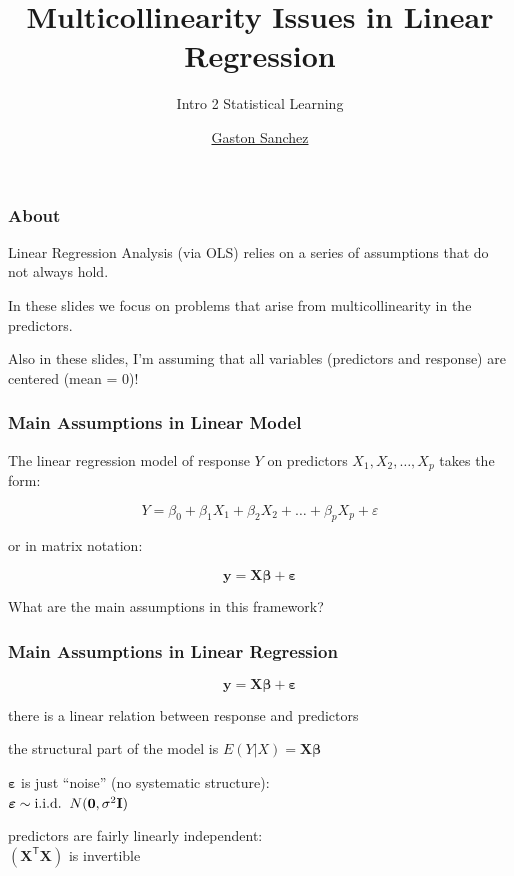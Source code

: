 \documentclass[12pt]{beamer}\usepackage[]{graphicx}\usepackage[]{color}
\title{Multicollinearity Issues in Linear Regression}
\subtitle{Intro 2 Statistical Learning}
\author{\href{http://www.gastonsanchez.com}{Gaston Sanchez}}
\institute{\href{https://creativecommons.org/licenses/by-sa/4.0/}{\tt \scriptsize \color{foreground} CC BY-SA 4.0}}
\date{}
\begin{document}
{
  \frame{\titlepage} 
}


\begin{frame}
\frametitle{About}

Linear Regression Analysis (via OLS) relies on a series of assumptions 
that do not always hold. 

\bigskip
In these slides we focus on problems that arise from multicollinearity
in the predictors.

\bigskip
Also in these slides, I'm assuming that all variables (predictors and response)
are centered (mean = 0)!

\end{frame}


\begin{frame}
\frametitle{Main Assumptions in Linear Model}

The linear regression model of response $Y$ on predictors 
$X_1, X_2, \dots, X_p$ takes the form:

$$
Y = \beta_0 + \beta_1 X_1 + \beta_2 X_2 + \dots + \beta_p X_p + \varepsilon
$$

or in matrix notation: 

$$
\mathbf{y} = \mathbf{X} \boldsymbol{\beta} + \boldsymbol{\varepsilon}
$$

{\lit What are the main assumptions in this framework?}

\end{frame}


\begin{frame}
\frametitle{Main Assumptions in Linear Regression}

$$
\mathbf{y} = \mathbf{X} \boldsymbol{\beta} + \boldsymbol{\varepsilon}
$$

\bi
  \item there is a linear relation between response and predictors
  \item the structural part of the model is $E(Y|X) = \mathbf{X} \boldsymbol{\beta}$
  \item $\boldsymbol{\varepsilon}$ is just ``noise'' (no systematic structure): \\
  $\boldsymbol{\varepsilon} \sim \text{i.i.d.} \hspace{2mm} N(\mathbf{0}, \sigma^2 \mathbf{I})$
  \item predictors are fairly linearly independent: \\
  $(\mathbf{X^\mathsf{T} X})$ is invertible
\ei
\eb

\end{frame}
\end{document}
